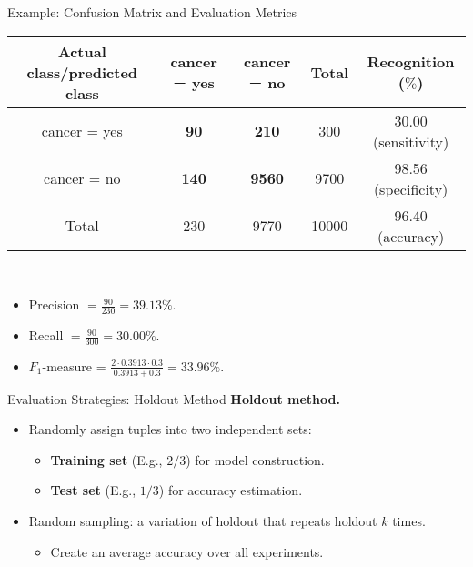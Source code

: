 \begin{frame}{Example: Confusion Matrix and Evaluation Metrics}
	\centering
	\begin{tabular}{|c|c|c|c|c|}
		\hline
		Actual class/predicted class & cancer = yes & cancer = no   & Total & Recognition ($\%$)  \\\hline
		cancer = yes                 & \textbf{90}  & \textbf{210}  & 300   & 30.00 (sensitivity) \\\hline
		cancer = no                  & \textbf{140} & \textbf{9560} & 9700  & 98.56 (specificity) \\\hline
		Total                        & 230          & 9770          & 10000 & 96.40 (accuracy)    \\\hline
	\end{tabular}\\[0.2cm]
	\begin{itemize}
		\item Precision $= \frac{90}{230} = 39.13 \%$.
		\item Recall $=\frac{90}{300} = 30.00 \%$.
		\item $F_1$-measure = $\frac{2 \cdot 0.3913 \cdot 0.3}{0.3913 + 0.3} = 33.96 \%$.
	\end{itemize}
\end{frame}

\begin{frame}{Evaluation Strategies: Holdout Method}
	\textbf{Holdout method.}
	\begin{itemize}
		\item Randomly assign tuples into two independent sets:
		      \begin{itemize}
			      \item \textbf{\color{airforceblue}Training set} (E.g., $2/3$) for model construction.
			      \item \textbf{\color{airforceblue}Test set} (E.g., $1/3$) for accuracy estimation.
		      \end{itemize}
		\item Random sampling: a variation of holdout that repeats holdout $k$ times.
		      \begin{itemize}
			      \item Create an average accuracy over all experiments.
		      \end{itemize}
	\end{itemize}

\end{frame}

